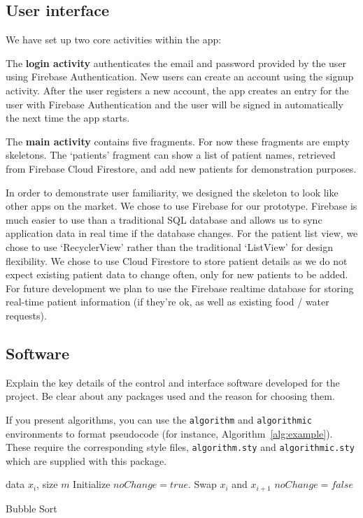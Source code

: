 \documentclass{article}
\begin{document}
\subsection{User interface}
We have set up two core activities within the app:

The {\bf login activity} authenticates the email and password provided by the user using Firebase Authentication. New users can create an account using the signup activity. After the user registers a new account, the app creates an entry for the user with Firebase Authentication and the user will be signed in automatically the next time the app starts.

The {\bf main activity} contains five fragments. For now these fragments are empty skeletons. The `patients' fragment can show a list of patient names, retrieved from Firebase Cloud Firestore, and add new patients for demonstration purposes.

In order to demonstrate user familiarity, we designed the skeleton to look like other apps on the market. We chose to use Firebase for our prototype. Firebase is much easier to use than a traditional SQL database and allows us to sync application data in real time if the database changes. For the patient list view, we chose to use `RecyclerView' rather than the traditional `ListView' for design flexibility. We chose to use Cloud Firestore to store patient details as we do not expect existing patient data to change often, only for new patients to be added. For future development we plan to use the Firebase realtime database for storing real-time patient information (if they're ok, as well as existing food / water requests).

\subsection{Software}

Explain the key details of the control and interface software developed for the project. Be clear about any packages used and the reason for choosing them. 

If you present algorithms, you can use the \verb+algorithm+ and \verb+algorithmic+ environments to format pseudocode (for instance, Algorithm~\ref{alg:example}). These require the corresponding style files, \verb+algorithm.sty+ and \verb+algorithmic.sty+ which are supplied with this package. 

\begin{algorithm}[ht]
\begin{algorithmic}
    data $x_i$, size $m$
   \REPEAT
   \STATE Initialize $noChange = true$.
   \STATE Swap $x_i$ and $x_{i+1}$
   \STATE $noChange = false$
   \ENDIF
   \ENDFOR
\end{algorithmic}
  \caption{Bubble Sort}
  \label{alg:example}
\end{algorithm}
\end{document}
